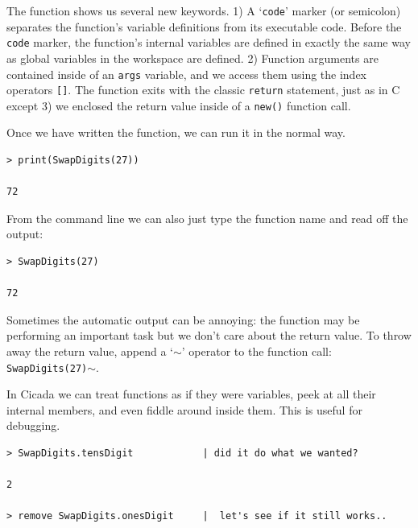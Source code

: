 \documentclass{article}
\newenvironment{code}{
       \begin{list}{}{
               \setlength{\leftmargin}{.4in}
               \setlength{\rightmargin}{0in}
               \setlength{\topsep}{.2in}
       }
       \small
       \item[] }
       { \end{list}   }
\begin{document}
\noindent The function shows us several new keywords.  1) A `\texttt{code}' marker (or semicolon) separates the function's variable definitions from its executable code.  Before the \verb#code# marker, the function's internal variables are defined in exactly the same way as global variables in the workspace are defined.  2) Function arguments are contained inside of an \texttt{args} variable, and we access them using the index operators \verb#[]#.  The function exits with the classic \texttt{return} statement, just as in C except 3) we enclosed the return value inside of a \verb#new()# function call.

Once we have written the function, we can run it in the normal way.

\begin{code} \begin{verbatim}
> print(SwapDigits(27))

72
\end{verbatim} \end{code}

\noindent From the command line we can also just type the function name and read off the output:

\begin{code} \begin{verbatim}
> SwapDigits(27)

72
\end{verbatim} \end{code}

\noindent Sometimes the automatic output can be annoying:  the function may be performing an important task but we don't care about the return value.  To throw away the return value, append a `$\sim$' operator to the function call:  \texttt{SwapDigits(27)}$\sim$.

In Cicada we can treat functions as if they were variables, peek at all their internal members, and even fiddle around inside them.  This is useful for debugging.

\begin{code} \begin{verbatim}
> SwapDigits.tensDigit            | did it do what we wanted?

2

> remove SwapDigits.onesDigit     |  let's see if it still works..
\end{verbatim} \end{code}
\end{document}
